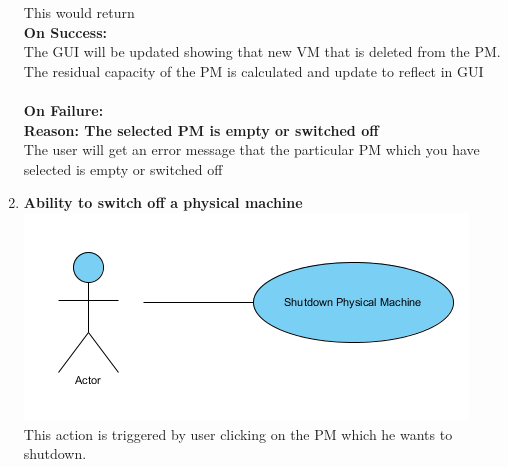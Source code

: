 \documentclass[a4paper,11pt]{article}
\begin{document}
\begin{enumerate}
				This would return \\
				{\bf On Success: }\\
				The GUI will be updated showing that new  VM that is deleted from the PM.
				The residual capacity of the PM is calculated and update to reflect in GUI\\\\
				{\bf On Failure: } \\
				{\bf Reason: The selected PM is empty or switched off}\\
				The user will get an error message that the particular PM which you have selected is empty or 
				switched off
				
				
				
				\item {\bf Ability to switch off a physical machine}\\
				\includegraphics{images/shut}
				\\This action is triggered by user clicking on the PM which he wants to shutdown. 
								

\end{enumerate}
\end{document}
